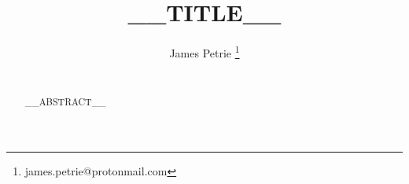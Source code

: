 \documentclass{article}
\title{__TITLE__}
\author{
  James Petrie  \thanks{james.petrie@protonmail.com} \\
  \\
}
\begin{document}
\maketitle

\begin{abstract}
__ABSTRACT__
\end{abstract}
\end{document}
